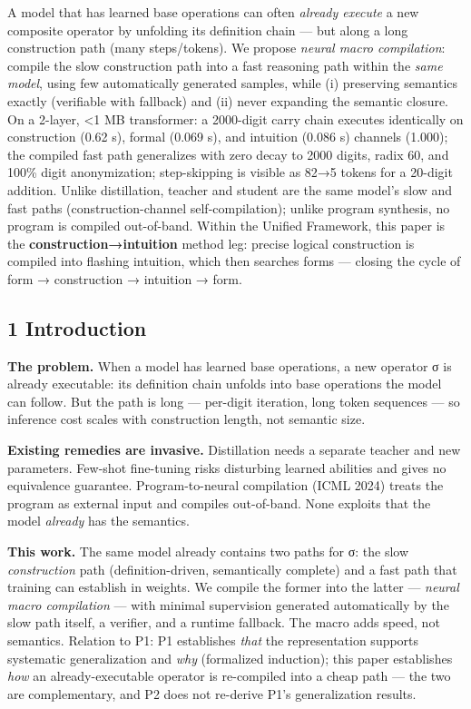 \documentclass[
]{article}
\begin{document}
A model that has learned base operations can often \emph{already
execute} a new composite operator by unfolding its definition chain ---
but along a long construction path (many steps/tokens). We propose
\emph{neural macro compilation}: compile the slow construction path into
a fast reasoning path within the \emph{same model}, using few
automatically generated samples, while (i) preserving semantics exactly
(verifiable with fallback) and (ii) never expanding the semantic
closure. On a 2-layer, \textless1 MB transformer: a 2000-digit carry
chain executes identically on construction (0.62 s), formal (0.069 s),
and intuition (0.086 s) channels (1.000); the compiled fast path
generalizes with zero decay to 2000 digits, radix 60, and 100\% digit
anonymization; step-skipping is visible as 82→5 tokens for a 20-digit
addition. Unlike distillation, teacher and student are the same model's
slow and fast paths (construction-channel self-compilation); unlike
program synthesis, no program is compiled out-of-band. Within the
Unified Framework, this paper is the \textbf{construction→intuition}
method leg: precise logical construction is compiled into flashing
intuition, which then searches forms --- closing the cycle of form →
construction → intuition → form.

\subsection{1 Introduction}\label{introduction}

\textbf{The problem.} When a model has learned base operations, a new
operator σ is already executable: its definition chain unfolds into base
operations the model can follow. But the path is long --- per-digit
iteration, long token sequences --- so inference cost scales with
construction length, not semantic size.

\textbf{Existing remedies are invasive.} Distillation needs a separate
teacher and new parameters. Few-shot fine-tuning risks disturbing
learned abilities and gives no equivalence guarantee. Program-to-neural
compilation (ICML 2024) treats the program as external input and
compiles out-of-band. None exploits that the model \emph{already} has
the semantics.

\textbf{This work.} The same model already contains two paths for σ: the
slow \emph{construction} path (definition-driven, semantically complete)
and a fast path that training can establish in weights. We compile the
former into the latter --- \emph{neural macro compilation} --- with
minimal supervision generated automatically by the slow path itself, a
verifier, and a runtime fallback. The macro adds speed, not semantics.
Relation to P1: P1 establishes \emph{that} the representation supports
systematic generalization and \emph{why} (formalized induction); this
paper establishes \emph{how} an already-executable operator is
re-compiled into a cheap path --- the two are complementary, and P2 does
not re-derive P1's generalization results.
\end{document}
